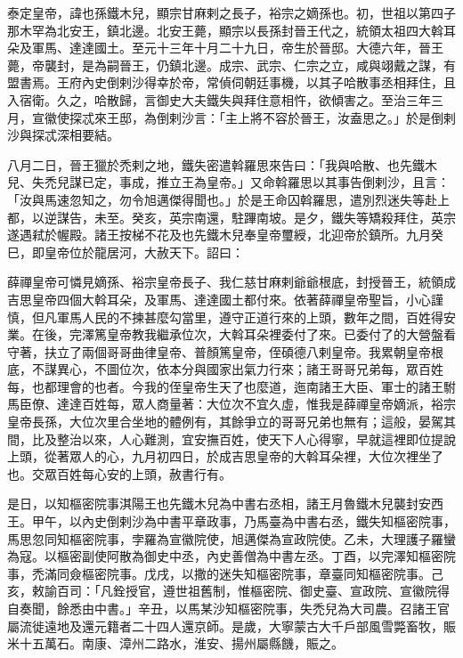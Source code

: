 
\begin{pinyinscope}

 泰定皇帝，諱也孫鐵木兒，顯宗甘麻剌之長子，裕宗之嫡孫也。初，世祖以第四子那木罕為北安王，鎮北邊。北安王薨，顯宗以長孫封晉王代之，統領太祖四大斡耳朵及軍馬、達達國土。至元十三年十月二十九日，帝生於晉邸。大德六年，晉王薨，帝襲封，是為嗣晉王，仍鎮北邊。成宗、武宗、仁宗之立，咸與翊戴之謀，有盟書焉。王府內史倒剌沙得幸於帝，常偵伺朝廷事機，以其子哈散事丞相拜住，且入宿衛。久之，哈散歸，言御史大夫鐵失與拜住意相忤，欲傾害之。至治三年三月，宣徽使探忒來王邸，為倒剌沙言：「主上將不容於晉王，汝盍思之。」於是倒剌沙與探忒深相要結。



 八月二日，晉王獵於禿剌之地，鐵失密遣斡羅思來告曰：「我與哈散、也先鐵木兒、失禿兒謀已定，事成，推立王為皇帝。」又命斡羅思以其事告倒剌沙，且言：「汝與馬速忽知之，勿令旭邁傑得聞也。」於是王命囚斡羅思，遣別烈迷失等赴上都，以逆謀告，未至。癸亥，英宗南還，駐蹕南坡。是夕，鐵失等矯殺拜住，英宗遂遇弒於幄殿。諸王按梯不花及也先鐵木兒奉皇帝璽綬，北迎帝於鎮所。九月癸巳，即皇帝位於龍居河，大赦天下。詔曰：



 薛禪皇帝可憐見嫡孫、裕宗皇帝長子、我仁慈甘麻剌爺爺根底，封授晉王，統領成吉思皇帝四個大斡耳朵，及軍馬、達達國土都付來。依著薛禪皇帝聖旨，小心謹慎，但凡軍馬人民的不揀甚麼勾當里，遵守正道行來的上頭，數年之間，百姓得安業。在後，完澤篤皇帝教我繼承位次，大斡耳朵裡委付了來。已委付了的大營盤看守著，扶立了兩個哥哥曲律皇帝、普顏篤皇帝，侄碩德八剌皇帝。我累朝皇帝根底，不謀異心，不圖位次，依本分與國家出氣力行來；諸王哥哥兄弟每，眾百姓每，也都理會的也者。今我的侄皇帝生天了也麼道，迤南諸王大臣、軍士的諸王駙馬臣僚、達達百姓每，眾人商量著：大位次不宜久虛，惟我是薛禪皇帝嫡派，裕宗皇帝長孫，大位次里合坐地的體例有，其餘爭立的哥哥兄弟也無有；這般，晏駕其間，比及整治以來，人心難測，宜安撫百姓，使天下人心得寧，早就這裡即位提說上頭，從著眾人的心，九月初四日，於成吉思皇帝的大斡耳朵裡，大位次裡坐了也。交眾百姓每心安的上頭，赦書行有。



 是日，以知樞密院事淇陽王也先鐵木兒為中書右丞相，諸王月魯鐵木兒襲封安西王。甲午，以內史倒剌沙為中書平章政事，乃馬臺為中書右丞，鐵失知樞密院事，馬思忽同知樞密院事，孛羅為宣徽院使，旭邁傑為宣政院使。乙未，大理護子羅蠻為寇。以樞密副使阿散為御史中丞，內史善僧為中書左丞。丁酉，以完澤知樞密院事，禿滿同僉樞密院事。戊戌，以撒的迷失知樞密院事，章臺同知樞密院事。己亥，敕諭百司：「凡銓授官，遵世祖舊制，惟樞密院、御史臺、宣政院、宣徽院得自奏聞，餘悉由中書。」辛丑，以馬某沙知樞密院事，失禿兒為大司農。召諸王官屬流徙遠地及還元籍者二十四人還京師。是歲，大寧蒙古大千戶部風雪斃畜牧，賑米十五萬石。南康、漳州二路水，淮安、揚州屬縣饑，賑之。




\end{pinyinscope}
